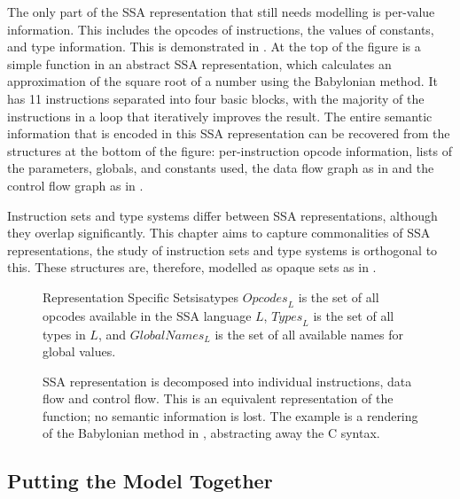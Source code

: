     The only part of the SSA representation that still needs modelling is
    per-value information.
    This includes the opcodes of instructions, the values of constants,
    and type information.
    This is demonstrated in .
    At the top of the figure is a simple function in an abstract SSA
    representation, which calculates an approximation of the square root of a
    number using the Babylonian method.
    It has 11 instructions separated into four basic blocks, with the majority
    of the instructions in a loop that iteratively improves the result.
    The entire semantic information that is encoded in this SSA representation
    can be recovered from the structures at the bottom of the figure:
    per-instruction opcode information, lists of the parameters, globals, and
    constants used, the data flow graph as in  and the control
    flow graph as in .

    Instruction sets and type systems differ between SSA representations,
    although they overlap significantly.
    This chapter aims to capture commonalities of SSA representations, the study
    of instruction sets and type systems is orthogonal to this.
    These structures are, therefore, modelled as opaque sets as in
    .

\begin{figure}[h]
\begin{definition}{Representation Specific Sets}{isatypes}
    $\textit{Opcodes}_L$ is the set of all opcodes available in the SSA language $L$,
    $\textit{Types}_L$ is the set of all types in $L$,
    and $\textit{GlobalNames}_L$ is the set of all available names for global values.
\end{definition}
\end{figure}

\begin{figure}[p]

\caption{SSA representation is decomposed into individual instructions, data
         flow and control flow.
         This is an equivalent representation of the function; no semantic
         information is lost.
         The example is a rendering of the Babylonian method in
         , abstracting away the C syntax.}
\label{fig:separation}
\end{figure}

\subsection{Putting the Model Together}

